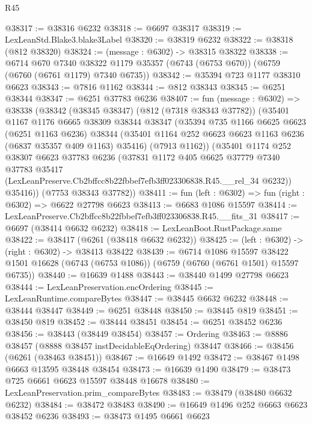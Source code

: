 \begin{lexlean}{R45}
\begin{coremodule}
{@38317 := @38316 @6232
@38318 := @6697 @38317
@38319 := LexLeanStd.Blake3.blake3Label
@38320 := @38319 @6232
@38322 := @38318 (@812 @38320)
@38324 := (message : @6302) -> @38315 @38322
@38338 := @6714
    @670
    @7340
    @38322
    @1179
    @35357
    (@6743 (@6753 @670))
    (@6759 (@6760 (@6761 @1179) @7340 @6735))
@38342 := @35394 @723 @1177 @38310 @6623
@38343 := @7816 @1162
@38344 := @812 @38343
@38345 := @6251 @38344
@38347 := @6251 @37783 @6236
@38407 := fun (message : @6302) =>
  @38338
    (@38342
      (@38345 @38347)
      (@812 (@7318 @38343 @37782))
      (@35401
        @1167
        @1176
        @6665
        @38309
        @38344
        @38347
        (@35394
          @735
          @1166
          @6625
          @6623
          (@6251 @1163 @6236)
          @38344
          (@35401 @1164 @252 @6623 @6623 @1163 @6236 (@6837 @35357 @409 @1163) @35416)
          (@7913 @1162))
        (@35401
          @1174
          @252
          @38307
          @6623
          @37783
          @6236
          (@37831
            @1172
            @405
            @6625
            @37779
            @7340
            @37783
            @35417
            (LexLeanPreserve.Cb2bffcc8b22fbbef7efb3ff023306838.R45.__rel_34 @6232))
          @35416))
      (@7753 @38343 @37782))
@38411 := fun (left : @6302) => fun (right : @6302) => @6622 @27798 @6623
@38413 := @6683 @1086 @15597
@38414 := LexLeanPreserve.Cb2bffcc8b22fbbef7efb3ff023306838.R45.__fits_31
@38417 := @6697 (@38414 @6632 @6232)
@38418 := LexLeanBoot.RustPackage.same
@38422 := @38417 (@6261 (@38418 @6632 @6232))
@38425 := (left : @6302) -> (right : @6302) -> @38413 @38422
@38439 := @6714
    @1086
    @15597
    @38422
    @1501
    @16628
    (@6743 (@6753 @1086))
    (@6759 (@6760 (@6761 @1501) @15597 @6735))
@38440 := @16639 @1488
@38443 := @38440 @1499 @27798 @6623
@38444 := LexLeanPreservation.encOrdering
@38445 := LexLeanRuntime.compareBytes
@38447 := @38445 @6632 @6232
@38448 := @38444 @38447
@38449 := @6251 @38448
@38450 := @38445 @819
@38451 := @38450 @819
@38452 := @38444 @38451
@38454 := @6251 @38452 @6236
@38456 := @38443 (@38449 @38454)
@38457 := Ordering
@38463 := @8886 @38457 (@8888 @38457 instDecidableEqOrdering) @38447
@38466 := @38456 (@6261 (@38463 @38451))
@38467 := @16649 @1492
@38472 := @38467 @1498 @6663 @13595 @38448 @38454
@38473 := @16639 @1490
@38479 := @38473 @725 @6661 @6623 @15597 @38448 @16678
@38480 := LexLeanPreservation.prim_compareBytes
@38483 := @38479 (@38480 @6632 @6232)
@38484 := @38472 @38483
@38490 := @16649 @1496 @252 @6663 @6623 @38452 @6236
@38493 := @38473 @1495 @6661 @6623
}
\end{coremodule}
\end{lexlean}
